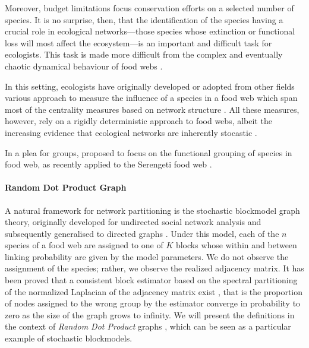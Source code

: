 \documentclass[12pt]{article}
\theoremstyle{definition}
\begin{document}
Moreover, budget limitations focus conservation efforts on a selected number of species. It is no surprise, then, that the identification of the species having a crucial role in ecological networks---those species whose extinction or functional loss will most affect the ecosystem---is an important and difficult task for ecologists. This task is made more difficult from the complex and eventually chaotic dynamical behaviour of food webs \cite{MayStability1973,sole2001complexity,XXX}.

In this setting, ecologists have originally developed or adopted from other fields various approach to measure the influence of a species in a food web \cite{estrada2007characterization,martin2010centrality} which span most of the centrality measures based on network structure \cite{harary1959status, freeman1977set,freeman1979centrality,bonacich1987power,brin1998anatomy}. All these measures, however, rely on a rigidly deterministic approach to food webs, albeit the increasing evidence that ecological networks are inherently stocastic \cite{Poisotetal,XXX}. 

In a plea for groups, \cite{allesina2009food} proposed to focus on the functional grouping of species in food web, as recently applied to the Serengeti food web \cite{baskerville2011spatial}.

\paragraph{Random Dot Product Graph}

A natural framework for network partitioning is the stochastic blockmodel graph theory, originally developed for undirected social network analysis  \cite{holland1983stochastic} and subsequently generalised to directed graphs \cite{wang1987stochastic}.  Under this model, each of the $n$ species of a food web are assigned to one of $K$ blocks whose within and between linking probability are given by the model parameters. We do not observe the assignment of the species; rather, we observe the realized adjacency matrix. It has been proved that a consistent block estimator based on the spectral partitioning of the normalized Laplacian of the adjacency matrix exist \cite{rohe2011spectral}, that is the proportion of nodes assigned to the wrong group by the estimator converge in probability to zero as the size of the graph grows to infinity. We will present the definitions in the context of \textit{Random Dot Product} graphs \cite{fishkind2013consistent}, which can be seen as a particular example of stochastic blockmodels.
\end{document}
